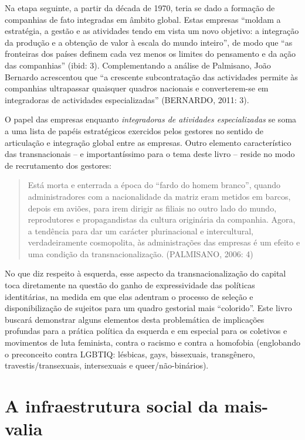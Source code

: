 Na etapa seguinte, a partir da década de 1970, teria se dado a formação
de companhias de fato integradas em âmbito global. Estas empresas
``moldam a estratégia, a gestão e as atividades tendo em vista um novo
objetivo: a integração da produção e a obtenção de valor à escala do
mundo inteiro'', de modo que ``as fronteiras dos países definem cada vez
menos os limites do pensamento e da ação das companhias'' (ibid: 3).
Complementando a análise de Palmisano, João Bernardo acrescentou que ``a
crescente subcontratação das actividades permite às companhias
ultrapassar quaisquer quadros nacionais e converterem-se em integradoras
de actividades especializadas'' (BERNARDO, 2011: 3).

O papel das empresas enquanto \emph{integradoras de atividades
especializadas} se soma a uma lista de papéis estratégicos exercidos
pelos gestores no sentido de articulação e integração global entre as
empresas. Outro elemento característico das transnacionais -- e
importantíssimo para o tema deste livro -- reside no modo de
recrutamento dos gestores:

\begin{quote}
Está morta e enterrada a época do ``fardo do homem branco'', quando
administradores com a nacionalidade da matriz eram metidos em barcos,
depois em aviões, para irem dirigir as filiais no outro lado do mundo,
reprodutores e propagandistas da cultura originária da companhia. Agora,
a tendência para dar um carácter plurinacional e intercultural,
verdadeiramente cosmopolita, às administrações das empresas é um efeito
e uma condição da transnacionalização. (PALMISANO, 2006: 4)
\end{quote}

No que diz respeito à esquerda, esse aspecto da transnacionalização do
capital toca diretamente na questão do ganho de expressividade das
políticas identitárias, na medida em que elas adentram o processo de
seleção e disponibilização de sujeitos para um quadro gestorial mais
``colorido''. Este livro buscará demonstrar alguns elementos desta
problemática de implicações profundas para a prática política da
esquerda e em especial para os coletivos e movimentos de luta feminista,
contra o racismo e contra a homofobia (englobando o preconceito contra
LGBTIQ: lésbicas, gays, bissexuais, transgênero, travestis/transexuais,
intersexuais e queer/não-binários).

\chapter{A infraestrutura social da mais-valia}

